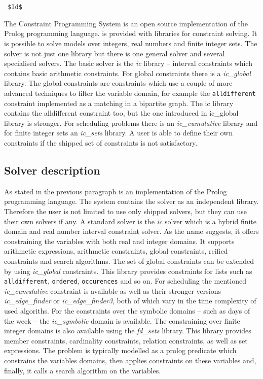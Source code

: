 \section{\eclipse}
\verb= $Id$ =

The \eclipse Constraint Programming System is an open source implementation of 
the Prolog programming language. \eclipse is provided with libraries for constraint 
solving. It is possible to solve models over integers, real numbers and finite 
integer sets. The solver is not just one library but there is one general solver 
and several specialised solvers. The basic solver is the {\em ic} library -- interval 
constraints which contains basic arithmetic constraints. For global constraints there 
is a {\em ic\_global} library. The global constraints are constraints
which use a couple of more advanced techniques to filter the variable domain, for example 
the \texttt{alldifferent} constraint implemented as a matching in a bipartite graph.
The ic library contains the alldifferent constraint too, but the one introduced in
ic\_global library is stronger. For scheduling problems there is an {\em ic\_cumulative}
library and for finite integer sets an {\em ic\_sets} library. A user is able to define their own
constraints if the shipped set of constraints is not satisfactory.

\subsection{Solver description}
As stated in the previous paragraph \eclipse is an implementation of the Prolog programming language.
The system contains the solver as an independent library. Therefore the user is not 
limited to use only shipped solvers, but they can use their own solvers if any.
A standard solver is the {\em ic} solver which is a hybrid finite domain and real number 
interval constraint solver. As the name suggests, it offers constraining the variables with
both real and integer domains. It supports arithmetic expressions, arithmetic constraints,
global constraints, reified constraints and search algorithms. The set of global constraints
can be extended by using {\em ic\_global} constraints. This library provides constraints
for lists such as \texttt{alldifferent}, \texttt{ordered}, \texttt{occurences} and so on.
For scheduling the mentioned {\em ic\_cumulative} constraint is available as well as 
their stronger versions {\em ic\_edge\_finder} or {\em ic\_ed\-ge\_fin\-der3}, both of which
vary in the time complexity of used algoriths. For the constraints over the symbolic 
domains -- such as days of the week -- the {\em ic\_symbolic} domain is available.  The 
constraining over finite integer domains is also available using the {\em fd\_sets} library.
This library provides member constraints, cardinality constraints, relation constraints,
as well as set expressions. The problem is typically modelled as a prolog predicate which constrains the variables domains,
then applies constraints on these variables and, finally, it calls a search algorithm 
on the variables. 

